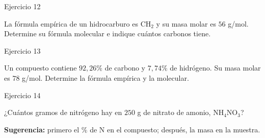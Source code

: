 \documentclass[aspectratio=169]{beamer}
\newcommand{\pc}{\text{\%}}
\begin{document}
\begin{frame}{Ejercicio 12}
  \begin{mwejercicio}
    La fórmula empírica de un hidrocarburo es $\text{CH}_2$ y su masa molar es
    $56$ g/mol. Determine su fórmula molecular e indique cuántos carbonos tiene.
  \end{mwejercicio}
\end{frame}

\begin{frame}{Ejercicio 13}
  \begin{mwejercicio}
    Un compuesto contiene $92{,}26\pc$ de carbono y $7{,}74\pc$ de hidrógeno.
    Su masa molar es $78$ g/mol. Determine la fórmula empírica y la molecular.
  \end{mwejercicio}
\end{frame}

\begin{frame}{Ejercicio 14}
  \begin{mwejercicio}
    ¿Cuántos gramos de nitrógeno hay en $250$ g de nitrato de amonio,
    $\text{NH}_4\text{NO}_3$?
    \par\smallskip
    \small
    \textbf{Sugerencia:} primero el $\pc$ de N en el compuesto; después, la masa en la muestra.
  \end{mwejercicio}
\end{frame}
\end{document}
